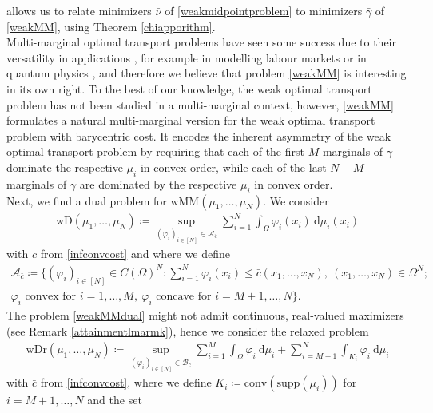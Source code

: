 \documentclass[letterpaper]{amsart}
\newcommand{\dd}{\mathrm{d}}
\theoremstyle{definition}
\begin{document}
allows us to relate minimizers $\bar\nu$ of \eqref{weakmidpointproblem} to minimizers $\bar\gamma$ of \eqref{weakMM}, using Theorem \ref{chiapporithm}.\\
Multi-marginal optimal transport problems have seen some success due to their versatility in applications \cite{pass2015}, for example in modelling labour markets \cite{chiappori2010,carlier2010} or in quantum physics \cite{cotar2018}, and therefore we believe that problem \eqref{weakMM} is interesting in its own right.
To the best of our knowledge, the weak optimal transport problem has not been studied in a multi-marginal context, however, \eqref{weakMM} formulates a natural multi-marginal version for the weak optimal transport problem with barycentric cost. It encodes the inherent asymmetry of the weak optimal transport problem by requiring that each of the first $M$ marginals of $\gamma$ dominate the respective $\mu_i$ in convex order, while each of the last $N-M$ marginals of $\gamma$ are dominated by the respective $\mu_i$ in convex order.\\
Next, we find a dual problem for $\text{wMM}(\mu_1,\dots,\mu_N)$. We consider
\begin{gather}\label{weakMMdual}
	\text{wD}(\mu_1,\dots,\mu_N)\coloneqq\sup_{(\varphi_i)_{i\in[N]}\in\mathcal A_{\bar c}}\sum_{i=1}^N\int_{\Omega}\varphi_i(x_i)\ \dd\mu_i(x_i)
\end{gather}
with $\bar c$ from \eqref{infconvcost} and where we define
\begin{equation}\label{A_cset}
	\begin{gathered}
		\mathcal A_{\bar c}\coloneqq\Big\{(\varphi_i)_{i\in[N]}\in C(\Omega)^N: \sum_{i=1}^N\varphi_i(x_i)\leq \bar c(x_1,\dots,x_N),\ (x_1,\dots,x_N)\in\Omega^N;\\ \varphi_i\text{ convex for }i=1,\dots,M,\ \varphi_i\text{ concave for }i=M+1,\dots,N\Big\}.
	\end{gathered}
\end{equation}
The problem \eqref{weakMMdual} might not admit continuous, real-valued maximizers (see Remark \ref{attainmentlmarmk}), hence we consider the relaxed problem
\begin{gather}\label{weakMMdualrelaxed}
	\text{wDr}(\mu_1,\dots,\mu_N)\coloneqq\sup_{(\varphi_i)_{i\in[N]}\in\mathcal B_{\bar c}}\sum_{i=1}^M\int_{\Omega}\varphi_i\  \dd\mu_i+\sum_{i=M+1}^N\int_{K_i}\varphi_i\ \dd\mu_i
\end{gather}
with $\bar c$ from \eqref{infconvcost}, where we define $K_i\coloneqq\text{conv}(\text{supp}(\mu_i))$ for $i=M+1,\dots,N$ and the set
\end{document}
